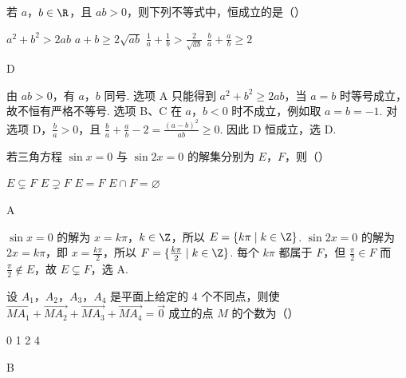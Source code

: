 \begin{problem}
若 \(a\)，\(b \in \R\)，且 \(ab > 0\)，则下列不等式中，恒成立的是（\quad）

\choices
    {\(a^2 + b^2 > 2ab\)}
    {\(a + b \geqslant 2\sqrt{ab}\)}
    {\(\frac{1}{a} + \frac{1}{b} > \frac{2}{\sqrt{ab}}\)}
    {\(\frac{b}{a} + \frac{a}{b} \geqslant 2\)}
\end{problem}

\begin{answer}
D
\end{answer}

\begin{solution}
由 \(ab>0\)，有 \(a\)，\(b\) 同号. 选项 A 只能得到 \(a^2+b^2\geqslant2ab\)，当 \(a=b\) 时等号成立，故不恒有严格不等号. 选项 B、C 在 \(a\)，\(b<0\) 时不成立，例如取 \(a=b=-1\). 对选项 D，\(\frac ba>0\)，且
\(\frac ba+\frac ab-2=\frac{(a-b)^2}{ab}\geqslant0\). 因此 D 恒成立，选 D.
\end{solution}

\begin{problem}
若三角方程 \(\sin x = 0\) 与 \(\sin 2x = 0\) 的解集分别为 \(E\)，\(F\)，则（\quad）

\choices
    {\(E \subsetneq F\)}
    {\(E \supsetneq F\)}
    {\(E = F\)}
    {\(E \cap F = \varnothing\)}
\end{problem}

\begin{answer}
A
\end{answer}

\begin{solution}
\(\sin x=0\) 的解为 \(x=k\pi\)，\(k\in\Z\)，所以 \(E=\{k\pi\mid k\in\Z\}\). \(\sin2x=0\) 的解为 \(2x=k\pi\)，即 \(x=\frac{k\pi}{2}\)，所以 \(F=\{\frac{k\pi}{2}\mid k\in\Z\}\). 每个 \(k\pi\) 都属于 \(F\)，但 \(\frac\pi2\in F\) 而 \(\frac\pi2\notin E\)，故 \(E\subsetneq F\)，选 A.
\end{solution}

\begin{problem}
设 \(A_{1}\)，\(A_{2}\)，\(A_{3}\)，\(A_{4}\) 是平面上给定的 4 个不同点，则使 \(\overrightarrow{MA_{1}} + \overrightarrow{MA_{2}} + \overrightarrow{MA_{3}} + \overrightarrow{MA_{4}} = \overrightarrow{0}\) 成立的点 \(M\) 的个数为（\quad）

\choices
    {0}
    {1}
    {2}
    {4}
\end{problem}

\begin{answer}
B
\end{answer}

